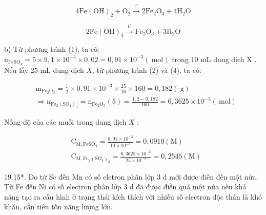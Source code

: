 \documentclass[10pt]{article}
\begin{document}
\begin{equation*}
4 \mathrm{Fe}(\mathrm{OH})_{2}+\mathrm{O}_{2} \xrightarrow{\mathrm{t}^{\circ}} 2 \mathrm{Fe}_{2} \mathrm{O}_{3}+4 \mathrm{H}_{2} \mathrm{O} \tag{4}
\end{equation*}



\begin{equation*}
2 \mathrm{Fe}(\mathrm{OH})_{3} \xrightarrow{\mathrm{t}^{\circ}} \mathrm{Fe}_{2} \mathrm{O}_{3}+3 \mathrm{H}_{2} \mathrm{O} \tag{5}
\end{equation*}


b) Từ phương trình (1), ta có:\\
$\mathrm{n}_{\mathrm{FeSO}_{4}}=5 \times 9,1 \times 10^{-3} \times 0,02=0,91 \times 10^{-3}(\mathrm{~mol})$ trong 10 mL dung dịch X .\\
Nếu lấy 25 mL dung dịch $X$, từ phương trình (2) và (4), ta có:

$$
\begin{aligned}
& \mathrm{m}_{\mathrm{Fe}_{2} \mathrm{O}_{3}}=\frac{1}{2} \times 0,91 \times 10^{-3} \times \frac{25}{10} \times 160=0,182(\mathrm{~g}) \\
& \Rightarrow \mathrm{n}_{\mathrm{Fe}_{2}\left(\mathrm{SO}_{4}\right)_{3}}=\mathrm{n}_{\mathrm{Fe}_{2} \mathrm{O}_{3}}(5)=\frac{1,2-0,182}{160}=6,3625 \times 10^{-3}(\mathrm{~mol})
\end{aligned}
$$

Nồng độ của các muối trong dung dịch $X$ :

$$
\begin{aligned}
& \mathrm{C}_{\mathrm{M}, \mathrm{FeSO}_{4}}=\frac{0,91 \times 10^{-3}}{10 \times 10^{-3}}=0,0910(\mathrm{M}) \\
& \mathrm{C}_{\mathrm{M}, \mathrm{Fe}_{2}\left(\mathrm{SO}_{4}\right)_{3}}=\frac{6,3625 \times 10^{-3}}{25 \times 10^{-3}}=0,2545(\mathrm{M})
\end{aligned}
$$

19.15*. Do từ Sc đến Mn có số eletron phân lớp 3 d mới được điền đến một nửa. Từ Fe đến Ni có số electron phân lớp 3 d đã được điền quá một nửa nên khả năng tạo ra cấu hình ở trạng thái kích thích với nhiều số electron độc thân là khó khăn, cần tiêu tốn năng lượng lớn.
\end{document}
